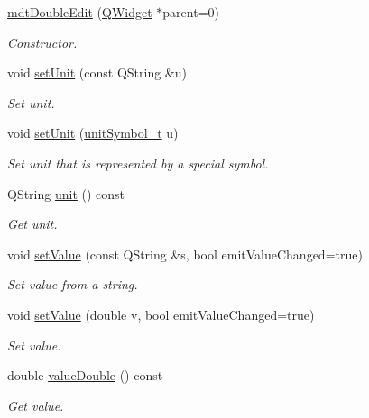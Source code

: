 \begin{DoxyCompactItemize}
\item 
\hyperlink{classmdt_double_edit_a4b6a416aeb8594ad45fb706e79250ba7}{mdt\-Double\-Edit} (\hyperlink{class_q_widget}{Q\-Widget} $\ast$parent=0)
\begin{DoxyCompactList}\small\item\em Constructor. \end{DoxyCompactList}\item 
void \hyperlink{classmdt_double_edit_a3eb1b0434235fae23fa3f795fb90066e}{set\-Unit} (const Q\-String \&u)
\begin{DoxyCompactList}\small\item\em Set unit. \end{DoxyCompactList}\item 
void \hyperlink{classmdt_double_edit_a7574871fecfb0130e9d8947b55629cca}{set\-Unit} (\hyperlink{classmdt_double_edit_a6e94cba2a7b3fcc16b70475c2cefd8cf}{unit\-Symbol\-\_\-t} u)
\begin{DoxyCompactList}\small\item\em Set unit that is represented by a special symbol. \end{DoxyCompactList}\item 
Q\-String \hyperlink{classmdt_double_edit_ad425b7f96ae6906175c7a70fa3b8b017}{unit} () const 
\begin{DoxyCompactList}\small\item\em Get unit. \end{DoxyCompactList}\item 
void \hyperlink{classmdt_double_edit_a827bb0d8a34a6fbaca4a328672140bae}{set\-Value} (const Q\-String \&s, bool emit\-Value\-Changed=true)
\begin{DoxyCompactList}\small\item\em Set value from a string. \end{DoxyCompactList}\item 
void \hyperlink{classmdt_double_edit_a81258812b5f964042840cee3e405ed27}{set\-Value} (double v, bool emit\-Value\-Changed=true)
\begin{DoxyCompactList}\small\item\em Set value. \end{DoxyCompactList}\item 
double \hyperlink{classmdt_double_edit_a2ffc11c9f013ff65b49642703146ec01}{value\-Double} () const 
\begin{DoxyCompactList}\small\item\em Get value. \end{DoxyCompactList}\item 

\end{DoxyCompactItemize}
